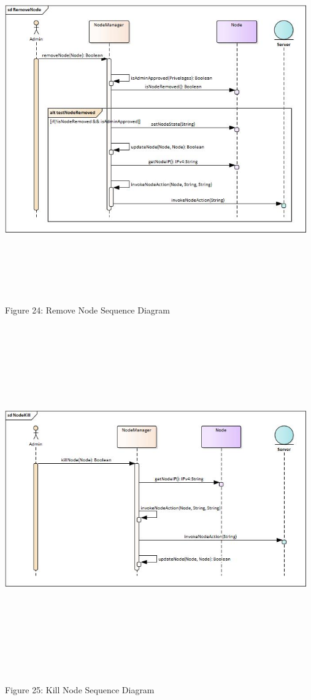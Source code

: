     \includegraphics[width=13cm,height=15cm,keepaspectratio]{admin_ui/images/sequence_diagrams/RemoveNode.jpg}
		\begin{center}
	    \small{Figure 24: Remove Node Sequence Diagram}
    \end{center}
    
     \includegraphics[width=13cm,height=15cm,keepaspectratio]{admin_ui/images/sequence_diagrams/NodeKill.jpg}
		\begin{center}
	    \small{Figure 25: Kill Node Sequence Diagram}
    \end{center}
    
